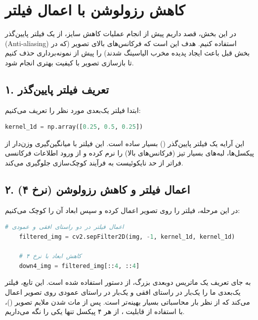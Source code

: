 \section{کاهش رزولوشن با اعمال فیلتر }

در این بخش، قصد داریم پیش از انجام عملیات کاهش سایز، از یک فیلتر پایین‌گذر (Anti-aliasing) استفاده کنیم. هدف این است که فرکانس‌های بالای تصویر (که در بخش قبل باعث ایجاد پدیده مخرب الیاسینگ شدند) را پیش از نمونه‌برداری حذف کنیم تا بازسازی تصویر با کیفیت بهتری انجام شود.

\subsection*{۱. تعریف فیلتر پایین‌گذر}
ابتدا فیلتر یک‌بعدی مورد نظر را تعریف می‌کنیم:

\begin{codebox}
\begin{lstlisting}[language=Python]
    kernel_1d = np.array([0.25, 0.5, 0.25])
\end{lstlisting}
\end{codebox}

این آرایه یک فیلتر پایین‌گذر () بسیار ساده است. این فیلتر با میانگین‌گیری وزن‌دار از پیکسل‌ها، لبه‌های بسیار تیز (فرکانس‌های بالا) را نرم کرده و از ورود اطلاعات فرکانسی فراتر از حد نایکوئیست به فرآیند کوچک‌سازی جلوگیری می‌کند.

\subsection*{۲. اعمال فیلتر و کاهش رزولوشن (نرخ ۴)}
در این مرحله، فیلتر را روی تصویر اعمال کرده و سپس ابعاد آن را کوچک می‌کنیم:

\begin{codebox}
\begin{lstlisting}[language=Python]
    # اعمال فیلتر در دو راستای افقی و عمودی
    filtered_img = cv2.sepFilter2D(img, -1, kernel_1d, kernel_1d)
    
    # کاهش ابعاد با نرخ ۴
    down4_img = filtered_img[::4, ::4]
\end{lstlisting}
\end{codebox}

به جای تعریف یک ماتریس دو‌بعدی بزرگ، از دستور  استفاده شده است. این تابع، فیلتر یک‌بعدی ما را یک‌بار در راستای افقی و یک‌بار در راستای عمودی روی تصویر اعمال می‌کند که از نظر بار محاسباتی بسیار بهینه‌تر است. پس از مات شدن ملایم تصویر ()، با استفاده از قابلیت ، از هر ۴ پیکسل تنها یکی را نگه می‌داریم.


